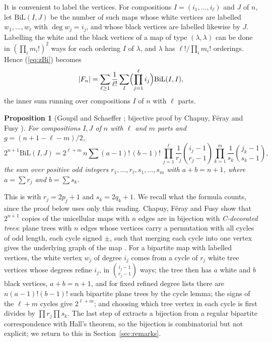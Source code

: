\documentclass[11pt]{amsart}
\newtheorem{proposition}[theorem]{Proposition}
\theoremstyle{remark}
\newcommand{\BiL}{\mathrm{BiL}}
\begin{document}
It is convenient to label the vertices. For compositions $I=(i_1,\dots,i_\ell)$ and $J$ of $n$, let $\BiL(I,J)$ be
the number of such maps whose white vertices are labelled $w_1,\dots,w_\ell$ with $\deg w_j=i_j$, and whose black
vertices are labelled likewise by $J$. Labelling the white and the black vertices of a map of type $(\lambda,\lambda)$
can be done in $(\prod_i m_i!)^2$ ways for each ordering $I$ of $\lambda$, and $\lambda$ has $\ell!/\prod_i m_i!$
orderings. Hence (\ref{eq:zBi}) becomes
\begin{equation}\label{eq:labelled}
  |F_n|=\sum_{\ell\ge1}\frac1{\ell!}\sum_{I}\Bigl(\prod_{j=1}^{\ell} i_j\Bigr)\BiL(I,I),
\end{equation}
the inner sum running over compositions $I$ of $n$ with $\ell$ parts.

\begin{proposition}[Goupil and Schaeffer \cite{GS}; bijective proof by Chapuy, F\'eray and Fusy {\cite[Prop.~9]{CFF}}]
\label{prop:GS}
For compositions $I,J$ of $n$ with $\ell$ and $m$ parts and $g=(n+1-\ell-m)/2$,
\[
  2^{n+1}\BiL(I,J)=2^{\ell+m}\,n\sum (a-1)!\,(b-1)!\,\prod_{j=1}^{\ell}\frac{1}{r_j}\binom{i_j-1}{r_j-1}
  \prod_{k=1}^{m}\frac{1}{s_k}\binom{j_k-1}{s_k-1},
\]
the sum over positive odd integers $r_1,\dots,r_\ell,s_1,\dots,s_m$ with $a+b=n+1$, where $a=\sum r_j$ and
$b=\sum s_k$.
\end{proposition}

This is \cite[Prop.~9]{CFF} with $r_j=2p_j+1$ and $s_k=2q_k+1$. We recall what the formula counts, since the
proof below uses only this reading. Chapuy, F\'eray and Fusy show that $2^{n+1}$ copies of the unicellular maps
with $n$ edges are in bijection with \emph{C-decorated trees}: plane trees with $n$ edges whose vertices carry a
permutation with all cycles of odd length, each cycle signed $\pm$, such that merging each cycle into one vertex gives
the underlying graph of the map \cite[Thm.~5]{CFF}. For a bipartite map with labelled vertices, the white vertex
$w_j$ of degree $i_j$ comes from a cycle of $r_j$ white tree vertices whose degrees refine $i_j$, in
$\binom{i_j-1}{r_j-1}$ ways; the tree then has $a$ white and $b$ black vertices, $a+b=n+1$, and for fixed refined
degree lists there are $n(a-1)!(b-1)!$ such bipartite plane trees by the cycle lemma; the signs of the
$\ell+m$ cycles give $2^{\ell+m}$; and choosing which tree vertex in each cycle is first divides by
$\prod r_j\prod s_k$. The last step of \cite[Thm.~5]{CFF} extracts a bijection from a regular bipartite
correspondence with Hall's theorem, so the bijection is combinatorial but not explicit; we return to this in
Section~\ref{sec:remarks}.
\end{document}
